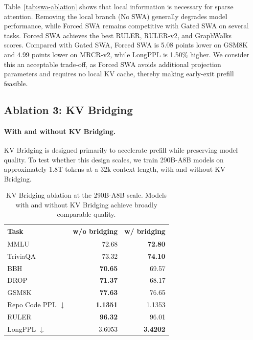 Table~\ref{tab:swa-ablation} shows that local information is necessary for sparse attention. Removing the local branch (No SWA) generally degrades model performance, while Forced SWA remains competitive with Gated SWA on several tasks.
Forced SWA achieves the best RULER, RULER-v2, and GraphWalks scores. Compared with Gated SWA, Forced SWA is 5.08 points lower on GSM8K and 4.99 points lower on MRCR-v2, while LongPPL is 1.50\% higher.
We consider this an acceptable trade-off, as Forced SWA avoids additional projection parameters and requires no local KV cache, thereby making early-exit prefill feasible.

\subsection{Ablation 3: KV Bridging}
\label{sec:kv-mirror-ablation}

\paragraph{With and without KV Bridging.}

KV Bridging is designed primarily to accelerate prefill while preserving model quality. To test whether this design scales, we train 290B-A8B models on approximately 1.8T tokens at a 32k context length, with and without KV Bridging.


\begin{table}[H]
    \centering
    \small
    \setlength{\tabcolsep}{12pt}
    \begin{tabular}{lrr}
        \toprule
        \textbf{Task} & \textbf{w/o bridging} & \textbf{w/ bridging} \\
        \midrule
        MMLU & 72.68 & \textbf{72.80} \\
        TriviaQA & 73.32 & \textbf{74.10} \\
        BBH & \textbf{70.65} & 69.57 \\
        DROP & \textbf{71.37} & 68.17 \\
        GSM8K & \textbf{77.63} & 76.65 \\
        Repo Code PPL $\downarrow$ & \textbf{1.1351} & 1.1353 \\
        RULER & \textbf{96.32} & 96.01 \\
        LongPPL $\downarrow$ & 3.6053 & \textbf{3.4202} \\
        \bottomrule
    \end{tabular}
    \caption{KV Bridging ablation at the 290B-A8B scale. Models with and without KV Bridging achieve broadly comparable quality.}
    \label{tab:kv-mirror-results}
\end{table}

